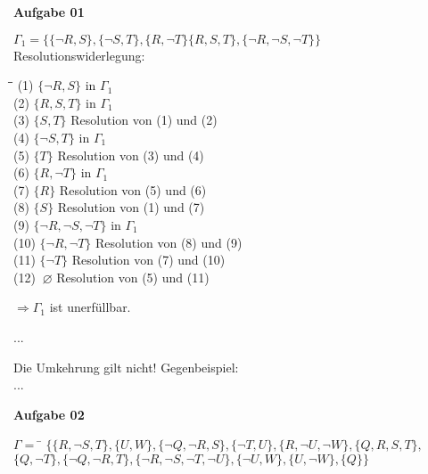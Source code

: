 \documentclass[a4paper,10pt]{article}
\begin{document}
	\parindent0pt
	\textbf{Aufgabe 01}
	\begin{compactenum} [(a)]
		\item $ \Gamma_1 = \{\{\lnot R,S\}, \{\lnot S, T\}, \{R,\lnot T\} \{R,S,T\},\{ \lnot R, \lnot S, \lnot T \} \} $ \\
		
		Resolutionswiderlegung:
		\begin{tabbing}
			\= \qquad \= \qquad\qquad\qquad \= \qquad\qquad \kill
			\>(1) \> $ \{\lnot R, S \} $ \> in $ \Gamma_1 $ \\
			\>(2) \> $ \{R, S, T\} $ \> in $ \Gamma_1 $ \\
			\>(3) \> $ \{S,T \} $ \> Resolution von (1) und (2) \\
			\>(4) \> $ \{\lnot S, T\} $ \> in $ \Gamma_1 $\\
			\>(5) \> $ \{T\} $ \> Resolution von (3) und (4) \\
			\>(6) \> $ \{R, \lnot T\} $ \> in $ \Gamma_1 $\\
			\>(7) \> $ \{R\} $ \> Resolution von (5) und (6) \\
			\>(8) \> $ \{S\} $ \> Resolution von (1) und (7) \\
			\>(9) \> $ \{\lnot R, \lnot S, \lnot T\} $ \> in $ \Gamma_1 $ \\
			\>(10) \> $ \{\lnot R, \lnot T\} $ \> Resolution von (8) und (9) \\
			\>(11) \> $ \{\lnot T\} $ \> Resolution von (7) und (10)\\
			\>(12) \> $ \ \varnothing $ \> Resolution von (5) und (11) 
		\end{tabbing}
		$ \Rightarrow \Gamma_1 $ ist unerfüllbar. \\
		
		\item ...\\
		
		\item Die Umkehrung gilt nicht! Gegenbeispiel: \\
		...
	\end{compactenum}
	\newpage
	\textbf{Aufgabe 02}
	\begin{tabbing}
			$ \Gamma = $ \= $ \{\{R,\lnot S,T\},\{U,W\},\{\lnot Q,\lnot R,S\},\{\lnot T,U\},\{R,\lnot U,\lnot W\},\{Q,R,S,T\}, $ \\
			\> $ \{Q,\lnot T\},\{\lnot Q, \lnot R,T\},\{\lnot R,\lnot S,\lnot T,\lnot U\},\{\lnot U,W\},\{U,\lnot W\},\{Q\}\} $
	\end{tabbing}
\end{document}
